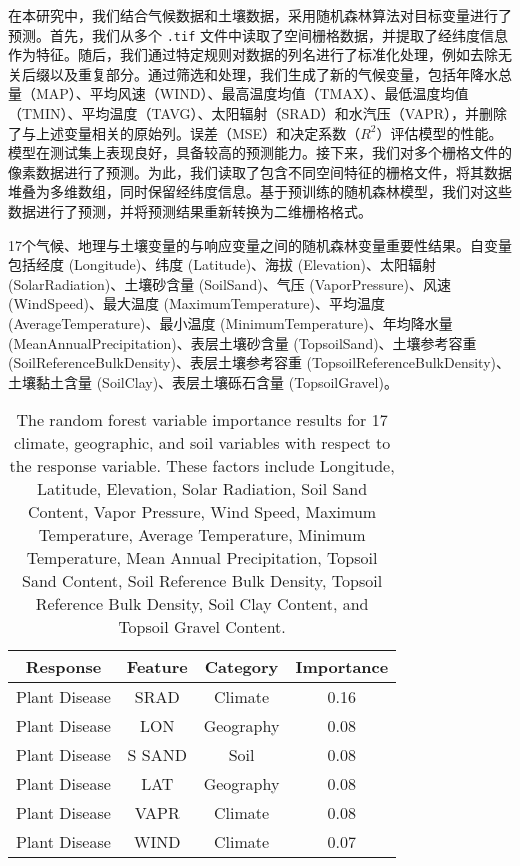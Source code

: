 \documentclass[AutoFakeBold]{LZUThesis-PgD&PhD}
\begin{document}
	
	在本研究中，我们结合气候数据和土壤数据，采用随机森林算法对目标变量进行了预测。首先，我们从多个 \texttt{.tif} 文件中读取了空间栅格数据，并提取了经纬度信息作为特征。随后，我们通过特定规则对数据的列名进行了标准化处理，例如去除无关后缀以及重复部分。通过筛选和处理，我们生成了新的气候变量，包括年降水总量（MAP）、平均风速（WIND）、最高温度均值（TMAX）、最低温度均值（TMIN）、平均温度（TAVG）、太阳辐射（SRAD）和水汽压（VAPR），并删除了与上述变量相关的原始列。误差（MSE）和决定系数（$R^2$）评估模型的性能。模型在测试集上表现良好，具备较高的预测能力。接下来，我们对多个栅格文件的像素数据进行了预测。为此，我们读取了包含不同空间特征的栅格文件，将其数据堆叠为多维数组，同时保留经纬度信息。基于预训练的随机森林模型，我们对这些数据进行了预测，并将预测结果重新转换为二维栅格格式。
	
	
	\begin{table}[H]
		\caption{17个气候、地理与土壤变量的与响应变量之间的随机森林变量重要性结果。自变量包括经度 (Longitude)、纬度 (Latitude)、海拔 (Elevation)、太阳辐射 (SolarRadiation)、土壤砂含量 (SoilSand)、气压 (VaporPressure)、风速 (WindSpeed)、最大温度 (MaximumTemperature)、平均温度 (AverageTemperature)、最小温度 (MinimumTemperature)、年均降水量 (MeanAnnualPrecipitation)、表层土壤砂含量 (TopsoilSand)、土壤参考容重 (SoilReferenceBulkDensity)、表层土壤参考容重 (TopsoilReferenceBulkDensity)、土壤黏土含量 (SoilClay)、表层土壤砾石含量 (TopsoilGravel)。}
		\caption*{The random forest variable importance results for 17 climate, geographic, and soil variables with respect to the response variable. These factors include Longitude, Latitude, Elevation, Solar Radiation, Soil Sand Content, Vapor Pressure, Wind Speed, Maximum Temperature, Average Temperature, Minimum Temperature, Mean Annual Precipitation, Topsoil Sand Content, Soil Reference Bulk Density, Topsoil Reference Bulk Density, Soil Clay Content, and Topsoil Gravel Content.}
		\label{tab:feature_importance}
		\begin{tabular}{cccc}
			\toprule
			Response & Feature & Category & Importance \\
			\midrule
			Plant Disease & SRAD & Climate & 0.16 \\
			Plant Disease & LON & Geography & 0.08 \\
			Plant Disease & S SAND & Soil & 0.08 \\
			Plant Disease & LAT & Geography & 0.08 \\
			Plant Disease & VAPR & Climate & 0.08 \\
			Plant Disease & WIND & Climate & 0.07 \\

\end{tabular}
\end{table}
\end{document}
